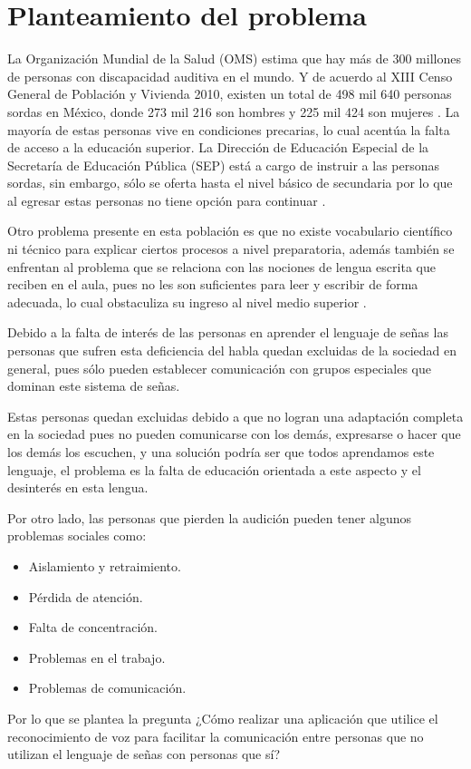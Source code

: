 
\section{Planteamiento del problema}

La Organización Mundial de la Salud (OMS) estima que hay más de 300 millones de personas con discapacidad auditiva en el mundo. Y de acuerdo al XIII Censo General de Población y Vivienda 2010, existen un total de 498 mil 640 personas sordas en México, donde 273 mil 216 son hombres y 225 mil 424 son mujeres \cite{Valencia2012}. La mayoría de estas personas vive en condiciones precarias, lo cual acentúa la falta de acceso a la educación superior. La Dirección de Educación Especial de la Secretaría de Educación Pública (SEP) está a cargo de instruir a las personas sordas, sin embargo, sólo se oferta hasta el nivel básico de secundaria por lo que al egresar estas personas no tiene opción para continuar \cite{Miranda2003}.

	Otro problema presente en esta población es que no existe  vocabulario científico ni técnico para explicar ciertos procesos a nivel preparatoria, además también se enfrentan al problema que se relaciona con las nociones de lengua escrita que reciben en el aula, pues no les son suficientes para leer y escribir de forma adecuada, lo cual obstaculiza su ingreso al nivel medio superior \cite{Miranda2003}.	

	Debido a la falta de interés de las personas en aprender el lenguaje de señas las personas que sufren esta deficiencia del habla quedan excluidas de la sociedad en general, pues sólo pueden establecer comunicación con grupos especiales que dominan este sistema de señas.

	Estas personas quedan excluidas debido a que no logran una adaptación completa en la sociedad pues no pueden comunicarse con los demás, expresarse o hacer que los demás los escuchen, y una solución podría ser que todos aprendamos este lenguaje, el problema es la falta de educación orientada a este aspecto y el desinterés en esta lengua. 


	Por otro lado, las personas que pierden la audición pueden tener algunos problemas sociales como:

	\begin{itemize}
		\item Aislamiento y retraimiento.
		\item Pérdida de atención.
		\item Falta de concentración.
		\item Problemas en el trabajo.
		\item Problemas de comunicación.
	\end{itemize}


	Por lo que se plantea la pregunta ¿Cómo realizar una aplicación que utilice el reconocimiento de voz para facilitar la comunicación entre personas que no utilizan el lenguaje de señas con personas que sí?